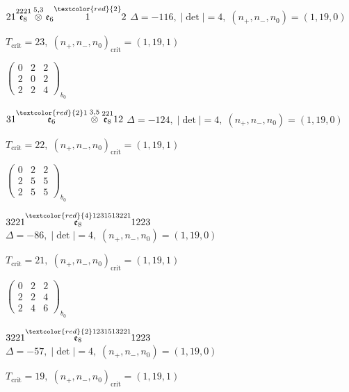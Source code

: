 \documentclass[10pt]{article}
\begin{document}
$21\overset{2221}{\mathfrak{e}_8}\overset{5,3}{\otimes}\mathfrak{e}_6\overset{\textcolor{red}{2}}{1}2$ \quad $\Delta=-116,\; |\det|=4,\; (n_+,n_-,n_0)=(1,19,0)$

\hspace{1em}$T_{\text{crit}}=23,\; (n_+,n_-,n_0)_{\text{crit}}=(1,19,1)$

\hspace{2em}$\left(\begin{smallmatrix}0 & 2 & 2 \\ 2 & 0 & 2 \\ 2 & 2 & 4\end{smallmatrix}\right)_{\!b_0}$

\smallskip

$31\overset{\textcolor{red}{2}1}{\mathfrak{e}_6}\overset{3,5}{\otimes}\overset{221}{\mathfrak{e}_8}12$ \quad $\Delta=-124,\; |\det|=4,\; (n_+,n_-,n_0)=(1,19,0)$

\hspace{1em}$T_{\text{crit}}=22,\; (n_+,n_-,n_0)_{\text{crit}}=(1,19,1)$

\hspace{2em}$\left(\begin{smallmatrix}0 & 2 & 2 \\ 2 & 5 & 5 \\ 2 & 5 & 5\end{smallmatrix}\right)_{\!b_0}$

\smallskip

$3221\overset{\textcolor{red}{4}1231513221}{\mathfrak{e}_8}1223$ \quad $\Delta=-86,\; |\det|=4,\; (n_+,n_-,n_0)=(1,19,0)$

\hspace{1em}$T_{\text{crit}}=21,\; (n_+,n_-,n_0)_{\text{crit}}=(1,19,1)$

\hspace{2em}$\left(\begin{smallmatrix}0 & 2 & 2 \\ 2 & 2 & 4 \\ 2 & 4 & 6\end{smallmatrix}\right)_{\!b_0}$

$3221\overset{\textcolor{red}{2}1231513221}{\mathfrak{e}_8}1223$ \quad $\Delta=-57,\; |\det|=4,\; (n_+,n_-,n_0)=(1,19,0)$

\hspace{1em}$T_{\text{crit}}=19,\; (n_+,n_-,n_0)_{\text{crit}}=(1,19,1)$
\end{document}
